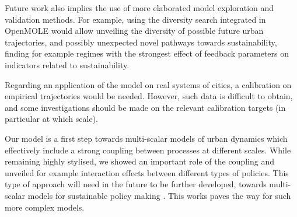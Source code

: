 \documentclass[ijgi,article,submit,moreauthors,pdftex]{Definitions/mdpi}
\begin{document}
Future work also implies the use of more elaborated model exploration and validation methods. For example, using the diversity search integrated in OpenMOLE \cite{reuillon2013openmole} would allow unveiling the diversity of possible future urban trajectories, and possibly unexpected novel pathways towards sustainability, finding for example regimes with the strongest effect of feedback parameters on indicators related to sustainability.

Regarding an application of the model on real systems of cities, a calibration on empirical trajectories would be needed. However, such data is difficult to obtain, and some investigations should be made on the relevant calibration targets (in particular at which scale).


Our model is a first step towards multi-scalar models of urban dynamics which effectively include a strong coupling between processes at different scales. While remaining highly stylised, we showed an important role of the coupling and unveiled for example interaction effects between different types of policies. This type of approach will need in the future to be further developed, towards multi-scalar models for sustainable policy making \cite{Rozenblat2018}. This works paves the way for such more complex models.












\vspace{6pt} 




\end{document}
